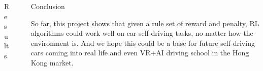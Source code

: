 \documentclass[final]{beamer}
\newlength{\sepwid}
\newlength{\onecolwid}
\newlength{\twocolwid}
\begin{document}
\begin{frame}[t]
\begin{columns}[t]
\begin{column}{\twocolwid}
\begin{columns}[t,totalwidth=\twocolwid]
\begin{column}{\onecolwid}
\begin{block}{Results}

\end{block}


\end{column} %

\end{columns} %

\end{column} %

\begin{column}{\sepwid}\end{column} %

\begin{column}{\onecolwid} %


\begin{block}{Conclusion}

So far, this project shows that given a rule set of reward and penalty, RL algorithms could work well on car self-driving tasks, no matter how the environment is. And we hope this could be a base for future self-driving cars coming into real life and even VR+AI driving school in the Hong Kong market.

\end{block}


\end{column}
\end{columns}
\end{frame}
\end{document}
